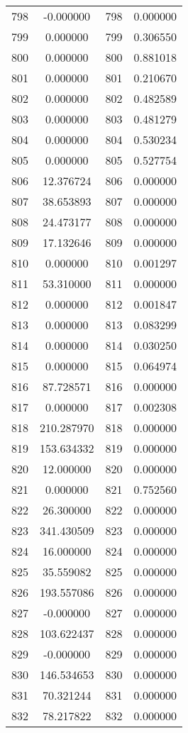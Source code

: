 \documentclass[12pt]{article}
\begin{document}
\begin{longtable}{@{}cccc@{}}
798 & -0.000000 & 798 & 0.000000 \\
799 & 0.000000 & 799 & 0.306550 \\
800 & 0.000000 & 800 & 0.881018 \\
801 & 0.000000 & 801 & 0.210670 \\
802 & 0.000000 & 802 & 0.482589 \\
803 & 0.000000 & 803 & 0.481279 \\
804 & 0.000000 & 804 & 0.530234 \\
805 & 0.000000 & 805 & 0.527754 \\
806 & 12.376724 & 806 & 0.000000 \\
807 & 38.653893 & 807 & 0.000000 \\
808 & 24.473177 & 808 & 0.000000 \\
809 & 17.132646 & 809 & 0.000000 \\
810 & 0.000000 & 810 & 0.001297 \\
811 & 53.310000 & 811 & 0.000000 \\
812 & 0.000000 & 812 & 0.001847 \\
813 & 0.000000 & 813 & 0.083299 \\
814 & 0.000000 & 814 & 0.030250 \\
815 & 0.000000 & 815 & 0.064974 \\
816 & 87.728571 & 816 & 0.000000 \\
817 & 0.000000 & 817 & 0.002308 \\
818 & 210.287970 & 818 & 0.000000 \\
819 & 153.634332 & 819 & 0.000000 \\
820 & 12.000000 & 820 & 0.000000 \\
821 & 0.000000 & 821 & 0.752560 \\
822 & 26.300000 & 822 & 0.000000 \\
823 & 341.430509 & 823 & 0.000000 \\
824 & 16.000000 & 824 & 0.000000 \\
825 & 35.559082 & 825 & 0.000000 \\
826 & 193.557086 & 826 & 0.000000 \\
827 & -0.000000 & 827 & 0.000000 \\
828 & 103.622437 & 828 & 0.000000 \\
829 & -0.000000 & 829 & 0.000000 \\
830 & 146.534653 & 830 & 0.000000 \\
831 & 70.321244 & 831 & 0.000000 \\
832 & 78.217822 & 832 & 0.000000 \\

\end{longtable}
\end{document}

